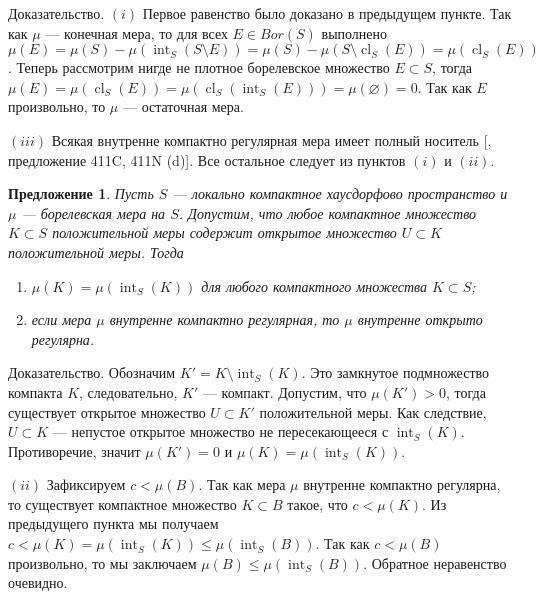 \documentclass[12pt]{article}
\numberwithin{equation}{subsection}
\theoremstyle{plain}
\newtheorem{proposition}{Предложение}
\newenvironment{proof}{Доказательство.}{}
\begin{document}
\begin{fulltext}
\begin{proof}
        $(i)$ Первое равенство было доказано в предыдущем пункте. Так как $\mu$
        --- конечная мера, то для всех $E\in Bor(S)$ выполнено
        $\mu(E)=\mu(S)-\mu(\operatorname{int}_S(S\setminus E))
            =\mu(S)-\mu(S\setminus\operatorname{cl}_S(E))
            =\mu(\operatorname{cl}_S(E))$. Теперь рассмотрим
        нигде не плотное борелевское множество $E\subset S$, тогда
        $\mu(E)=\mu(\operatorname{cl}_S(E))
            =\mu(\operatorname{cl}_S(\operatorname{int}_S(E)))
            =\mu(\varnothing)=0$.
        Так как $E$ произвольно, то $\mu$ --- остаточная мера.

        $(iii)$ Всякая внутренне компактно регулярная мера имеет полный носитель
        [\cite{FremMeasTh4.1}, предложение 411C, 411N (d)]. Все остальное
        следует из пунктов $(i)$ и $(ii)$.
    \end{proof}

    \begin{proposition}\label{NormalMeasCharac} Пусть $S$ --- локально
        компактное хаусдорфово пространство и $\mu$ --- борелевская мера на $S$.
        Допустим, что любое компактное множество $K\subset S$ положительной меры
        содержит открытое множество $U\subset K$ положительной меры. Тогда

        \begin{enumerate}[label = (\roman*)]
            \item $\mu(K)=\mu(\operatorname{int}_S(K))$ для любого компактного
                  множества $K\subset S$;

            \item если мера $\mu$ внутренне компактно регулярная, то $\mu$
                  внутренне открыто регулярна.
        \end{enumerate}
    \end{proposition}
    \begin{proof} Обозначим $K'=K\setminus \operatorname{int}_S(K)$. Это
        замкнутое подмножество компакта $K$, следовательно, $K'$ --- компакт.
        Допустим, что $\mu(K')>0$, тогда существует открытое множество $U\subset
            K'$ положительной меры. Как следствие, $U\subset K$ --- непустое
        открытое множество не пересекающееся с $\operatorname{int}_S(K)$.
        Противоречие, значит $\mu(K')=0$ и
        $\mu(K)=\mu(\operatorname{int}_S(K))$.

        $(ii)$ Зафиксируем $c<\mu(B)$. Так как мера $\mu$ внутренне компактно
        регулярна, то существует компактное множество $K\subset B$ такое, что
        $c<\mu(K)$. Из предыдущего пункта мы получаем
        $c<\mu(K)=\mu(\operatorname{int}_S(K))\leq\mu(\operatorname{int}_S(B))$.
        Так как $c<\mu(B)$ произвольно, то мы заключаем
        $\mu(B)\leq\mu(\operatorname{int}_S(B))$. Обратное неравенство очевидно.
    \end{proof}


\end{fulltext}
\end{document}

